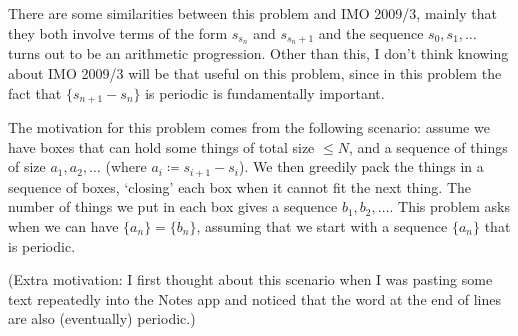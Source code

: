 \begin{remark*}
  There are some similarities between this problem and IMO 2009/3,
  mainly that they both involve terms of the form $s_{s_n}$ and $s_{s_n+1}$
  and the sequence $s_0, s_1,\dots$ turns out to be an arithmetic progression.
  Other than this, I don't think knowing about IMO 2009/3 will
  be that useful on this problem, since in this problem the fact
  that $\{s_{n+1}-s_n\}$ is periodic is fundamentally important.

  The motivation for this problem comes from the following scenario:
  assume we have boxes that can hold some things of total size $\le N$,
  and a sequence of things of size $a_1, a_2, \dots$
  (where $a_i \coloneqq s_{i+1} - s_i$).
  We then greedily pack the things in a sequence of boxes,
  `closing' each box when it cannot fit the next thing.
  The number of things we put in each box gives a sequence $b_1, b_2, \dots$.
  This problem asks when we can have $\{a_n\} = \{b_n\}$,
  assuming that we start with a sequence $\{a_n\}$ that is periodic.

  (Extra motivation: I first thought about this scenario
  when I was pasting some text repeatedly into the Notes app and noticed that
  the word at the end of lines are also (eventually) periodic.)
\end{remark*}
